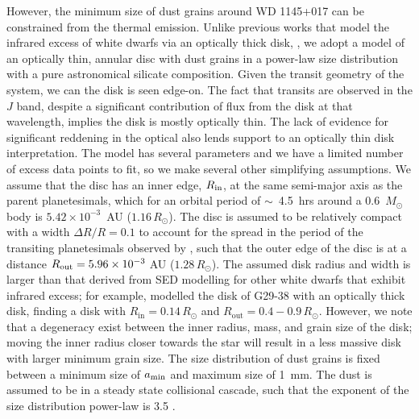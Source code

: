 \documentclass[apj]{emulateapj}
\begin{document}
However, the minimum size of dust grains around WD 1145+017 can be constrained from the thermal emission. Unlike previous works that model the infrared excess of white dwarfs via an optically thick disk, \citep[e.g.][]{2003ApJ...584L..91J,2009ApJ...694..805F}, we adopt a model of an optically thin, annular disc with dust grains in a power-law size distribution with a pure astronomical silicate composition. Given the transit geometry of the system, we can the disk is seen edge-on. The fact that transits are observed in the $J$ band, despite a significant contribution of flux from the disk at that wavelength, implies the disk is mostly optically thin. The lack of evidence for significant reddening in the optical also lends support to an optically thin disk interpretation. The model has several parameters and we have a limited number of excess data points to fit, so we make several other simplifying assumptions. We assume that the disc has an inner edge, $R_{\rm in}$, at the same semi-major axis as the parent planetesimals, which for an orbital period of $\sim$~4.5~hrs around a 0.6~$M_{\odot}$ body is $5.42\times10^{-3}$~AU ($1.16\,R_\odot$). The disc is assumed to be relatively compact with a width $\Delta R/R = 0.1$ to account for the spread in the period of the transiting planetesimals observed by \citet{2015Natur.526..546V}, such that the outer edge of the disc is at a distance $R_{\rm out} = 5.96\times10^{-3}~$AU ($1.28\,R_\odot$). The assumed disk radius and width is larger than that derived from SED modelling for other white dwarfs that exhibit infrared excess; for example, \citet{2003ApJ...584L..91J} modelled the disk of G29-38 with an optically thick disk, finding a disk with $R_\mathrm{in} = 0.14\,R_\odot$ and $R_\mathrm{out} = 0.4-0.9\,R_\odot$. However, we note that a degeneracy exist between the inner radius, mass, and grain size of the disk; moving the inner radius closer towards the star will result in a less massive disk with larger minimum grain size. The size distribution of dust grains is fixed between a minimum size of $a_{\rm min}$ and maximum size of 1~mm. The dust is assumed to be in a steady state collisional cascade, such that the exponent of the size distribution power-law is 3.5 \citep{1969JGR....74.2531D}. 
\end{document}
